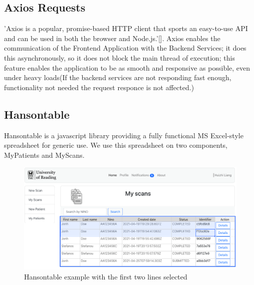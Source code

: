 		\subsection{Axios Requests}
			'Axios is a popular, promise-based HTTP client that sports an easy-to-use API and can be used in both the browser and 
			Node.js.'[\cite{jacques_2018}]. Axios enables the communication of the Frontend Application with the Backend Services; 
			it does this asynchronously, so it does not block the main thread of  execution; this feature enables the application to 
			be as smooth and responsive as possible, even under heavy loads(If the backend services are not responding fast enough, 
			functionality not needed the request responce is not affected.)
		\subsection{Hansontable}
			Hansontable is a javascript library providing a fully functional MS Excel-style spreadsheet for generic use. We use this spreadsheet on two 
			components, MyPatients and MyScans.
			\begin{figure}[H]
				\iftrue
				\caption{Hansontable example with the first two lines selected}
				\centering
				\includegraphics[scale=0.3]{figures/hansontable-example}
				\fi
			\end{figure}
			
			
			
			
